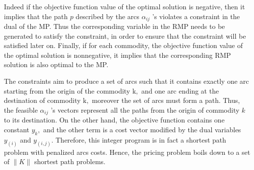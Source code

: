 Indeed if the objective function value of the optimal solution is negative, then it implies that the path $p$ described by the arcs $\alpha_{i j}$ 's violates a constraint in the dual of the MP. Thus the corresponding variable in the RMP needs to be generated to satisfy the constraint, in order to ensure that the constraint will be satisfied later on. Finally, if for each commodity, the objective function value of the optimal solution is nonnegative, it implies that the corresponding $\mathrm{RMP}$ solution is also optimal to the MP.

The constraints aim to produce a set of arcs such that it contains exactly one arc starting from the origin of the commodity $\mathrm{k},$ and one arc ending at the destination of commodity $\mathrm{k},$ moreover the set of arcs must form a path. Thus, the feasible $\alpha_{i j}$ 's vectors represent all the paths from the origin of commodity $k$ to its destination. On the other hand, the objective function contains one constant $y_{k},$ and the other term is a cost vector modified by the dual variables $y_{(i)}$ and $y_{(i, j)} .$ Therefore, this integer program is in fact a shortest path problem with penalized arcs costs. Hence, the pricing problem boils down to a set of $\|K\|$ shortest path problems.







